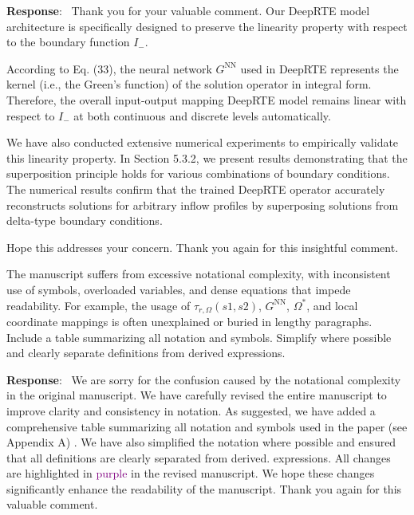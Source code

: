 \documentclass[12pt]{article}
\newcounter{reviewer}
\newcounter{point}[reviewer]
\renewcommand{\thepoint}{P\,\thereviewer.\arabic{point}}
\newenvironment{point}{\refstepcounter{point} \bigskip \noindent {\textbf{[Reviewer~Point~\thepoint]} }  }{\par }
\newenvironment{reply}{\medskip \noindent \textbf{Response}:\  \color{blue}\ignorespaces}{\medskip}
\begin{document}
\begin{reply}
	Thank you for your valuable comment. Our DeepRTE model architecture is specifically designed to preserve the linearity property with respect to the boundary function $I_{-}$.

	According to Eq. (33), the neural network $G^{\text{NN}}$ used in DeepRTE represents the kernel (i.e., the Green's function) of the solution operator in integral form. Therefore, the overall input-output mapping DeepRTE model remains linear with respect to $I_{-}$ at both continuous and discrete levels automatically.

	We have also conducted extensive numerical experiments to empirically validate this linearity property. In Section 5.3.2, we present results demonstrating that the superposition principle holds for various combinations of boundary conditions. The numerical results confirm that the trained DeepRTE operator accurately reconstructs solutions for arbitrary inflow profiles by superposing solutions from delta-type boundary conditions.

	Hope this addresses your concern. Thank you again for this insightful comment.
\end{reply}

\begin{point}
	The manuscript suffers from excessive notational complexity, with inconsistent use of symbols, overloaded variables, and dense equations that impede readability. For example, the usage of $\tau_{r,\Omega}(s1,s2)$, $G^{\text{NN}}$, $ \Omega^*$, and local coordinate mappings is often unexplained or buried in lengthy paragraphs. Include a table summarizing all notation and symbols. Simplify where possible and clearly separate definitions from derived expressions.
\end{point}

\begin{reply}
	We are sorry for the confusion caused by the notational complexity in the original manuscript. We have carefully revised the entire manuscript to improve clarity and consistency in notation. As suggested, we have added a comprehensive table summarizing all notation and symbols used in the paper (see Appendix A) .
	We have also simplified the notation where possible and ensured that all definitions are clearly separated from derived. expressions. All changes are highlighted in \textcolor{purple}{purple} in the revised manuscript.
	We hope these changes significantly enhance the readability of the manuscript. Thank you again for this valuable comment.
\end{reply}
\end{document}
